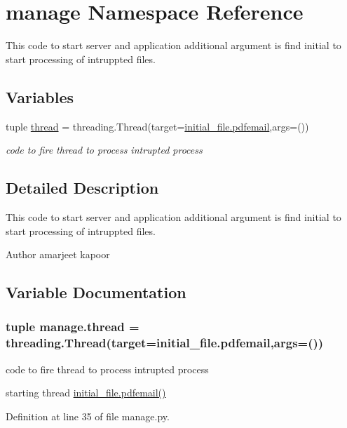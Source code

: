 \hypertarget{namespacemanage}{}\section{manage Namespace Reference}
\label{namespacemanage}


This code to start server and application additional argument is find initial to start processing of intruppted files.  


\subsection*{Variables}
\begin{DoxyCompactItemize}
\item 
tuple \hyperlink{namespacemanage_ab0c13dd165a5c8a6f3e3c029a2acd921}{thread} = threading.\+Thread(target=\hyperlink{namespaceinitial__file_a105b1aa7bf4db853b6f4d064ed224030}{initial\+\_\+file.\+pdfemail},args=())
\begin{DoxyCompactList}\small\item\em code to fire thread to process intrupted process \end{DoxyCompactList}\end{DoxyCompactItemize}


\subsection{Detailed Description}
This code to start server and application additional argument is find initial to start processing of intruppted files. 

\begin{DoxyAuthor}{Author}
amarjeet kapoor 
\end{DoxyAuthor}


\subsection{Variable Documentation}
\hypertarget{namespacemanage_ab0c13dd165a5c8a6f3e3c029a2acd921}{}
\subsubsection[{thread}]{\setlength{\rightskip}{0pt plus 5cm}tuple manage.\+thread = threading.\+Thread(target={\bf initial\+\_\+file.\+pdfemail},args=())}\label{namespacemanage_ab0c13dd165a5c8a6f3e3c029a2acd921}


code to fire thread to process intrupted process 

starting thread  \hyperlink{namespaceinitial__file_a105b1aa7bf4db853b6f4d064ed224030}{initial\+\_\+file.\+pdfemail()} 

Definition at line 35 of file manage.\+py.

